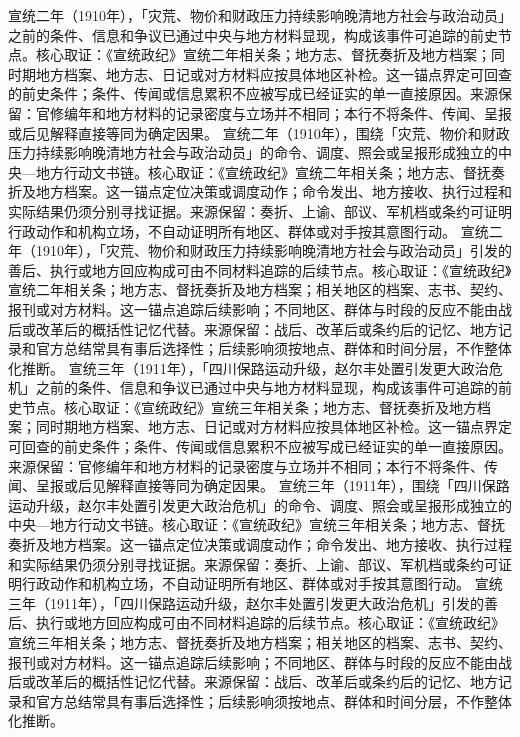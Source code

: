 宣统二年（1910年），「灾荒、物价和财政压力持续影响晚清地方社会与政治动员」之前的条件、信息和争议已通过中央与地方材料显现，构成该事件可追踪的前史节点。核心取证：《宣统政纪》宣统二年相关条；地方志、督抚奏折及地方档案；同时期地方档案、地方志、日记或对方材料应按具体地区补检。这一锚点界定可回查的前史条件；条件、传闻或信息累积不应被写成已经证实的单一直接原因。来源保留：官修编年和地方材料的记录密度与立场并不相同；本行不将条件、传闻、呈报或后见解释直接等同为确定因果。
宣统二年（1910年），围绕「灾荒、物价和财政压力持续影响晚清地方社会与政治动员」的命令、调度、照会或呈报形成独立的中央—地方行动文书链。核心取证：《宣统政纪》宣统二年相关条；地方志、督抚奏折及地方档案。这一锚点定位决策或调度动作；命令发出、地方接收、执行过程和实际结果仍须分别寻找证据。来源保留：奏折、上谕、部议、军机档或条约可证明行政动作和机构立场，不自动证明所有地区、群体或对手按其意图行动。
宣统二年（1910年），「灾荒、物价和财政压力持续影响晚清地方社会与政治动员」引发的善后、执行或地方回应构成可由不同材料追踪的后续节点。核心取证：《宣统政纪》宣统二年相关条；地方志、督抚奏折及地方档案；相关地区的档案、志书、契约、报刊或对方材料。这一锚点追踪后续影响；不同地区、群体与时段的反应不能由战后或改革后的概括性记忆代替。来源保留：战后、改革后或条约后的记忆、地方记录和官方总结常具有事后选择性；后续影响须按地点、群体和时间分层，不作整体化推断。
宣统三年（1911年），「四川保路运动升级，赵尔丰处置引发更大政治危机」之前的条件、信息和争议已通过中央与地方材料显现，构成该事件可追踪的前史节点。核心取证：《宣统政纪》宣统三年相关条；地方志、督抚奏折及地方档案；同时期地方档案、地方志、日记或对方材料应按具体地区补检。这一锚点界定可回查的前史条件；条件、传闻或信息累积不应被写成已经证实的单一直接原因。来源保留：官修编年和地方材料的记录密度与立场并不相同；本行不将条件、传闻、呈报或后见解释直接等同为确定因果。
宣统三年（1911年），围绕「四川保路运动升级，赵尔丰处置引发更大政治危机」的命令、调度、照会或呈报形成独立的中央—地方行动文书链。核心取证：《宣统政纪》宣统三年相关条；地方志、督抚奏折及地方档案。这一锚点定位决策或调度动作；命令发出、地方接收、执行过程和实际结果仍须分别寻找证据。来源保留：奏折、上谕、部议、军机档或条约可证明行政动作和机构立场，不自动证明所有地区、群体或对手按其意图行动。
宣统三年（1911年），「四川保路运动升级，赵尔丰处置引发更大政治危机」引发的善后、执行或地方回应构成可由不同材料追踪的后续节点。核心取证：《宣统政纪》宣统三年相关条；地方志、督抚奏折及地方档案；相关地区的档案、志书、契约、报刊或对方材料。这一锚点追踪后续影响；不同地区、群体与时段的反应不能由战后或改革后的概括性记忆代替。来源保留：战后、改革后或条约后的记忆、地方记录和官方总结常具有事后选择性；后续影响须按地点、群体和时间分层，不作整体化推断。
